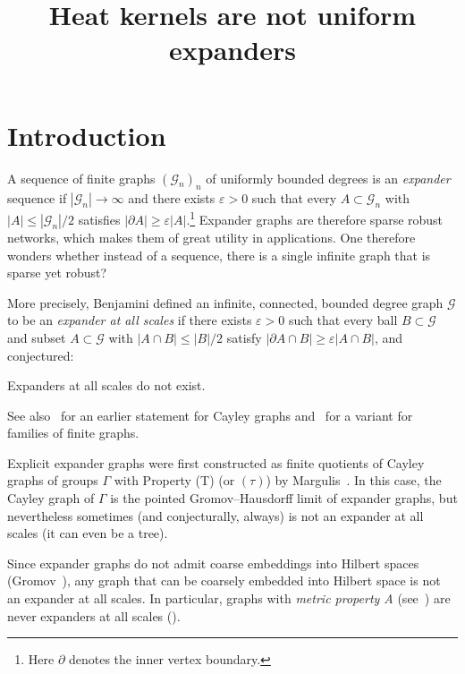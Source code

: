 \documentclass[AHL,Unicode,longabstracts,published]{cedram}
\title[Heat kernels are not uniform expanders]{Heat kernels are not uniform expanders}
\author[\initial{M.} \lastname{Fr\k{a}czyk}]{\firstname{Mikołaj} \lastname{Fr\k{a}czyk}}
\author[\initial{W.} \lastname{van Limbeek}]{\firstname{Wouter} \lastname{van Limbeek}}
\newcommand{\calG}{\mathcal{G}}
\begin{document}
\maketitle


\section{Introduction}\label{sec:intro}

A sequence of finite graphs $(\calG_n)_n$ of uniformly bounded degrees is an \emph{expander} sequence if $|\calG_n|\to\infty$ and there exists $\varepsilon>0$ such that every $A\subset \calG_n$ with $|A|\leq |\calG_n|/2$ satisfies $|\partial A|\geq \varepsilon |A|$.\footnote{Here $\partial$ denotes the inner vertex boundary.} Expander graphs are therefore sparse robust networks, which makes them of great utility in applications. One therefore wonders whether instead of a sequence, there is a single infinite graph that is sparse yet robust?

More precisely, Benjamini defined an infinite, connected, bounded degree graph $\calG$ to be an \emph{expander at all scales} if there exists $\varepsilon>0$ such that every ball $B\subset \calG$ and subset $A\subset \calG$ with $|A\cap B|\leq |B|/2$ satisfy $|\partial A\cap B|\geq \varepsilon |A\cap B|$, and conjectured:


\begin{conj}\label{conj:benjamini}
Expanders at all scales do not exist.
\end{conj}

See also~\cite{Benjamini1998} for an earlier statement for Cayley graphs and~\cite{BenjaminiErdos} for a variant for families of finite graphs.

Explicit expander graphs were first constructed as finite quotients of Cayley graphs of groups $\Gamma$ with Property (T) (or $(\tau)$) by Margulis~\cite{margulis_expander}. In this case, the Cayley graph of $\Gamma$ is the pointed Gromov--Hausdorff limit of expander graphs, but nevertheless sometimes (and conjecturally, always) is not an expander at all scales (it can even be a tree).

Since expander graphs do not admit coarse embeddings into Hilbert spaces (Gromov~\cite{gromov2003random}), any graph that can be coarsely embedded into Hilbert space is not an expander at all scales. In particular, graphs with \emph{metric property A} (see~\cite{NowakAMM}) are never expanders at all scales (\cite{Yu00}).
\end{document}

